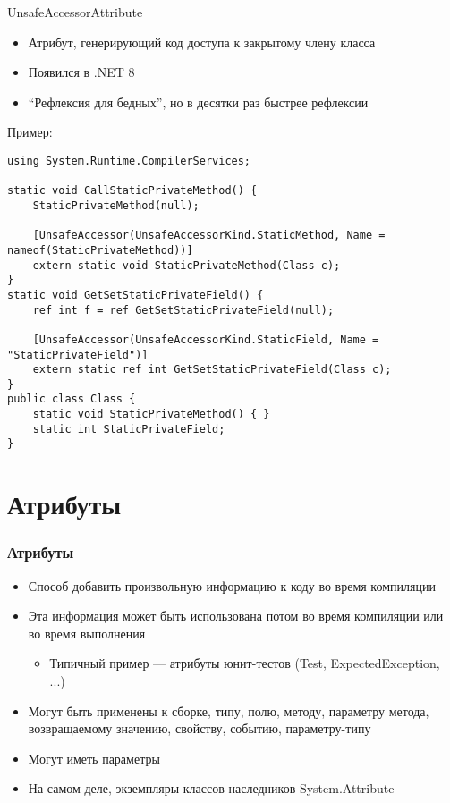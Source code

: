 \documentclass{../../slides-style}
\begin{document}
    \begin{frame}[fragile]{UnsafeAccessorAttribute}
        \begin{itemize}
            \item Атрибут, генерирующий код доступа к закрытому члену класса
            \item Появился в .NET 8
            \item \enquote{Рефлексия для бедных}, но в десятки раз быстрее рефлексии
        \end{itemize}
        Пример:
        \begin{scriptsize}
            \begin{verbatim}
using System.Runtime.CompilerServices;

static void CallStaticPrivateMethod() {
    StaticPrivateMethod(null);

    [UnsafeAccessor(UnsafeAccessorKind.StaticMethod, Name = nameof(StaticPrivateMethod))]
    extern static void StaticPrivateMethod(Class c);
}
static void GetSetStaticPrivateField() {
    ref int f = ref GetSetStaticPrivateField(null);

    [UnsafeAccessor(UnsafeAccessorKind.StaticField, Name = "StaticPrivateField")]
    extern static ref int GetSetStaticPrivateField(Class c);
}
public class Class {
    static void StaticPrivateMethod() { }
    static int StaticPrivateField;
}
            \end{verbatim}
        \end{scriptsize}
    \end{frame}

    \section{Атрибуты}

    \begin{frame}
        \frametitle{Атрибуты}
        \begin{itemize}
            \item Способ добавить произвольную информацию к коду во время компиляции
            \item Эта информация может быть использована потом во время компиляции или во время выполнения
            \begin{itemize}
                \item Типичный пример --- атрибуты юнит-тестов (Test, ExpectedException, ...)
            \end{itemize}
            \item Могут быть применены к сборке, типу, полю, методу, параметру метода, возвращаемому значению, свойству, событию, параметру-типу
            \item Могут иметь параметры
            \item На самом деле, экземпляры классов-наследников System.Attribute
        \end{itemize}
    \end{frame}
\end{document}
